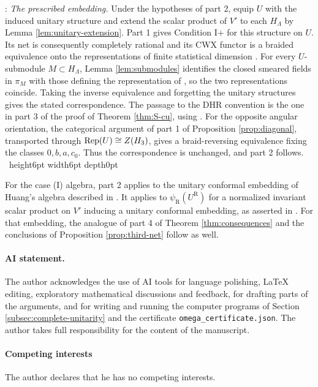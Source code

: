 \documentclass[leqno]{article}
\let\cal\relax
\newcommand{\cal}{\mathcal}
\newcommand{\qed}{\hfill \vrule height6pt  width6pt depth0pt}
\DeclareMathOperator{\Rep}{Rep} %
\newenvironment{proof}[1][]{\noindent {\it Proof #1} : }{\hbox{~}\qed
\smallskip
}
\numberwithin{equation}{section}
\begin{document}
\begin{proof}
\emph{The prescribed embedding.} Under the hypotheses of part 2, equip $U$ with the induced unitary structure and extend the scalar product of $V'$ to each $H_\Lambda$ by Lemma \ref{lem:unitary-extension}. Part 1 gives Condition I+ for this structure on $U$. Its net is consequently completely rational and its CWX functor is a braided equivalence onto the representations of finite statistical dimension \cite[(0.3) p.~8, Remark 4.16 p.~41, Theorem 6.14 pp.~68--69 and Definition 6.17 p.~70]{Gui25}. For every $U$-submodule $M \subset H_\Lambda$, Lemma \ref{lem:submodules} identifies the closed smeared fields in $\pi_M$ with those defining the representation of \cite[Definition 4.22 p.~43]{Gui25}, so the two representations coincide. Taking the inverse equivalence and forgetting the unitary structures gives the stated correspondence. The passage to the DHR convention is the one in part 3 of the proof of Theorem \ref{thm:S-cu}, using \cite[Theorem 6.6 p.~77 and (6.2) p.~74]{Gui21a}. For the opposite angular orientation, the categorical argument of part 1 of Proposition \ref{prop:diagonal}, transported through $\Rep(U) \cong Z(\cal H_3)$, gives a braid-reversing equivalence fixing the classes $0,b,a,c_0$. Thus the correspondence is unchanged, and part 2 follows.
\end{proof}

For the case (I) algebra, part 2 applies to the unitary conformal embedding of Huang's algebra described in \cite[Remark 7.14]{ArhIII}. It applies to $\psi_{\mathrm R}(U^{\mathrm R})$ for a normalized invariant scalar product on $V'$ inducing a unitary conformal embedding, as asserted in \cite[Theorem 1 p.~1 and p.~4]{Rie26}. For that embedding, the analogue of part 4 of Theorem \ref{thm:consequences} and the conclusions of Proposition \ref{prop:third-net} follow as well.

\paragraph{AI statement.}
The author acknowledges the use of AI tools for language polishing, LaTeX editing, exploratory mathematical discussions and feedback, for drafting parts of the arguments, and for writing and running the computer programs of Section \ref{subsec:complete-unitarity} and the certificate \texttt{omega\_certificate.json}. The author takes full responsibility for the content of the manuscript.

\paragraph{Competing interests} The author declares that he has no competing interests.
\end{document}
